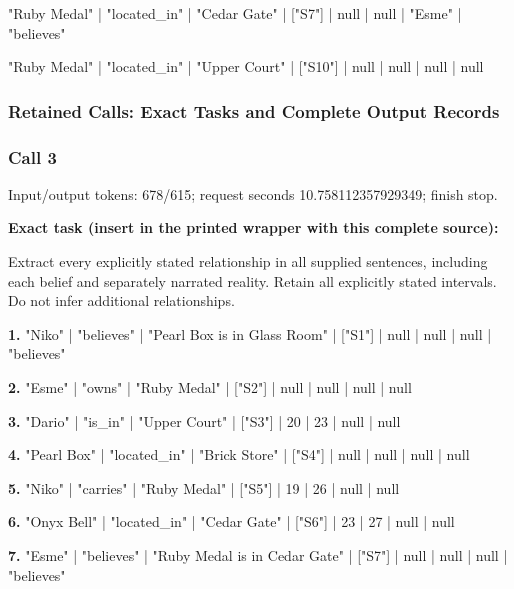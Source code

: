 "Ruby Medal" | "located\_in" | "Cedar Gate" | ["S7"] | null | null | "Esme" | "believes"\par\smallskip

"Ruby Medal" | "located\_in" | "Upper Court" | ["S10"] | null | null | null | null\par\smallskip

\subsubsection*{Retained Calls: Exact Tasks and Complete Output Records}

\subsubsection*{Call 3}

Input/output tokens: 678/615; request seconds 10.758112357929349; finish stop.

\noindent\textbf{Exact task (insert in the printed wrapper with this complete source):}\par Extract every explicitly stated relationship in all supplied sentences, including each belief and separately narrated reality. Retain all explicitly stated intervals. Do not infer additional relationships.

\noindent\textbf{1.} "Niko" | "believes" | "Pearl Box is in Glass Room" | ["S1"] | null | null | null | "believes"\par\smallskip

\noindent\textbf{2.} "Esme" | "owns" | "Ruby Medal" | ["S2"] | null | null | null | null\par\smallskip

\noindent\textbf{3.} "Dario" | "is\_in" | "Upper Court" | ["S3"] | 20 | 23 | null | null\par\smallskip

\noindent\textbf{4.} "Pearl Box" | "located\_in" | "Brick Store" | ["S4"] | null | null | null | null\par\smallskip

\noindent\textbf{5.} "Niko" | "carries" | "Ruby Medal" | ["S5"] | 19 | 26 | null | null\par\smallskip

\noindent\textbf{6.} "Onyx Bell" | "located\_in" | "Cedar Gate" | ["S6"] | 23 | 27 | null | null\par\smallskip

\noindent\textbf{7.} "Esme" | "believes" | "Ruby Medal is in Cedar Gate" | ["S7"] | null | null | null | "believes"\par\smallskip

